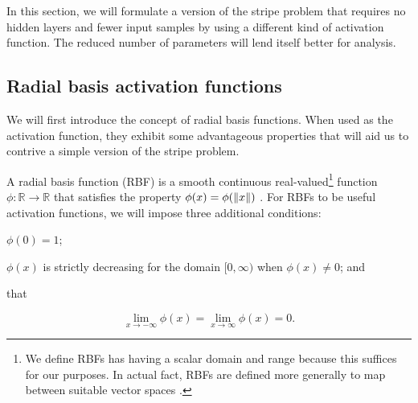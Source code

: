 In this section, we will formulate a version of the stripe problem that requires no hidden layers and fewer input samples by using a different kind of activation function.
The reduced number of parameters will lend itself better for analysis.

\subsection{Radial basis activation functions}
We will first introduce the concept of radial basis functions. 
When used as the activation function, they exhibit some advantageous properties that will aid us to contrive a simple version of the stripe problem.
\begin{definition}
    \label{def:rbf}
    A radial basis function (RBF) is a smooth continuous real-valued\footnote{We define RBFs has having a scalar domain and range because this suffices for our purposes. In actual fact, RBFs are defined more generally to map between suitable vector spaces \cite{buhmann2000}.} function $\phi : \mathbb{R} \rightarrow \mathbb{R}$ that satisfies the property $\phi(x) = \phi(\left\lVert x\right\rVert)$ \cite{buhmann2000}. 
    For RBFs to be useful activation functions, we will impose three additional conditions:
    \begin{enumerate*}[label=(\roman*)]
        \item $\phi(0)=1$;
        \item $\phi(x)$ is strictly decreasing for the domain $[0, \infty)$ when $\phi(x) \neq 0$; and
        \item that
    \end{enumerate*}
    \begin{equation*}
        \lim_{x\rightarrow -\infty}{\phi(x)} = \lim_{x\rightarrow \infty}{\phi(x)} = 0.
    \end{equation*}
\end{definition}

